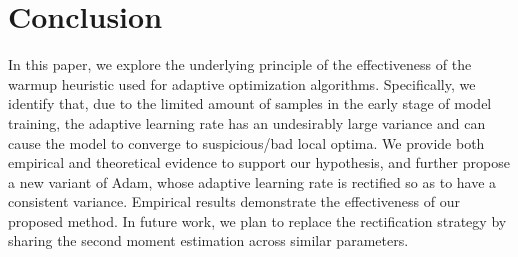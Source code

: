 
\section{Conclusion}
In this paper, we explore the underlying principle of the effectiveness of the warmup heuristic used for adaptive optimization algorithms. 
Specifically, we identify that, due to the limited amount of samples in the early stage of model training, the adaptive learning rate has an undesirably large variance and can cause the model to converge to suspicious/bad local optima. 
We provide both empirical and theoretical evidence to support our hypothesis, and further propose a new variant of Adam, whose adaptive learning rate is rectified so as to have a consistent variance. 
Empirical results demonstrate the effectiveness of our proposed method. 
In future work, we plan to replace the rectification strategy by sharing the second moment estimation across similar parameters. 